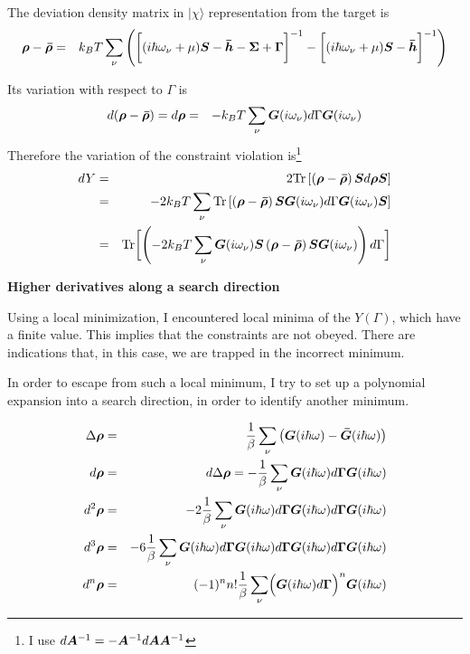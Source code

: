 \documentclass[11pt,a4paper]{report}
\begin{document}
The deviation density matrix in $|\chi\rangle$ representation from the target is
\begin{eqnarray}
\bm{\rho}-\bm{\bar{\rho}}
&=&k_BT\sum_\nu
\left(
\biggl[(i\hbar\omega_\nu+\mu)\bm{S}-\bm{\bar{h}}-\bm{\Sigma}+\bm{\Gamma}\biggr]^{-1}
-
\biggl[(i\hbar\omega_\nu+\mu)\bm{S}-\bm{\bar{h}}\biggr]^{-1}
\right)
\end{eqnarray}

Its variation with respect to $\Gamma$ is
\begin{eqnarray}
d(\bm{\rho}-\bm{\bar{\rho}})=d\bm{\rho}
&=&-k_BT\sum_\nu\bm{G}(i\omega_\nu)d\Gamma\bm{G}(i\omega_\nu)
\end{eqnarray}
Therefore the variation of the constraint violation is\footnote{I use 
$d\bm{A}^{-1}=-\bm{A}^{-1}d\bm{A}\bm{A}^{-1}$}
\begin{eqnarray}
dY&=&
2\mathrm{Tr}\left[\left(\bm{\rho}-\bm{\bar{\rho}}\right)\bm{S}
d\bm{\rho}\bm{S}\right]
\nonumber\\
&=&-2k_BT\sum_\nu
\mathrm{Tr}\left[\left(\bm{\rho}-\bm{\bar{\rho}}\right)\bm{S}
\bm{G}(i\omega_\nu)d\Gamma\bm{G}(i\omega_\nu)\bm{S}\right]
\nonumber\\
&=&
\mathrm{Tr}\biggl[
\left(-2k_BT\sum_\nu
\bm{G}(i\omega_\nu)\bm{S}\left(\bm{\rho}-\bm{\bar{\rho}}\right)\bm{S}
\bm{G}(i\omega_\nu)\right)d\Gamma\biggr]
\end{eqnarray}


\textbf{Higher derivatives along a search direction}

Using a local minimization, I encountered local minima of the
$Y(\Gamma)$, which have a finite value. This implies that the
constraints are not obeyed. There are indications that, in this case,
we are trapped in the incorrect minimum.

In order to escape from such a local minimum, I try to set up a
polynomial expansion into a search direction, in order to identify
another minimum.

\begin{eqnarray}
\Delta\bm{\rho}&=&\frac{1}{\beta}\sum_\nu \left(
\bm{G}(i\hbar\omega)
-\bm{\bar{G}}(i\hbar\omega)\right)
\nonumber\\
d\bm{\rho}&=&d\Delta\bm{\rho}=-\frac{1}{\beta}\sum_\nu 
\bm{G}(i\hbar\omega)d\bm{\Gamma}\bm{G}(i\hbar\omega)
\nonumber\\
d^2\bm{\rho}&=&-2\frac{1}{\beta}\sum_\nu 
\bm{G}(i\hbar\omega)d\bm{\Gamma}\bm{G}(i\hbar\omega)
d\bm{\Gamma}\bm{G}(i\hbar\omega)
\nonumber\\
d^3\bm{\rho}&=&-6\frac{1}{\beta}\sum_\nu 
\bm{G}(i\hbar\omega)d\bm{\Gamma}\bm{G}(i\hbar\omega)
d\bm{\Gamma}\bm{G}(i\hbar\omega)d\bm{\Gamma}\bm{G}(i\hbar\omega)
\nonumber\\
d^n\bm{\rho}&=&(-1)^nn!\frac{1}{\beta}\sum_\nu 
\Bigl(\bm{G}(i\hbar\omega)d\bm{\Gamma}\Bigr)^n\bm{G}(i\hbar\omega)
\end{eqnarray}
\end{document}

